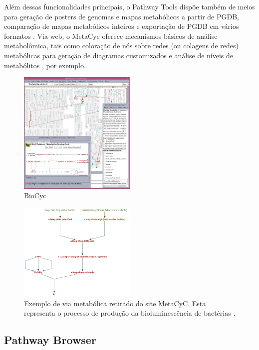 \documentclass[conference]{IEEEtran}
\begin{document}
\indent Além dessas funcionalidades principais, o Pathway Tools dispõe também de meios para geração de posters de genomas e mapas metabólicos a partir de PGDB, comparação de mapas metabólicos inteiros e exportação de PGDB em vários formatos \cite{MetacycDesktopVsWeb}. Via web, o MetaCyc oferece mecanismos básicos de análise metabolômica, tais como coloração de nós sobre redes (ou colagens de redes) metabólicas para geração de diagramas customizados e análise de níveis de metabólitos \cite{MetacycOmicAnalysis}, por exemplo.

\begin{figure}[!t]
\centering
\includegraphics[width=0.5\textwidth]{biocyc-pathwaytool-desktop.png}
\caption{BioCyc}
\label{metacyc_arvore}
\end{figure}


\begin{figure}[!t]
\centering
\includegraphics[width=0.5\textwidth]{bioLuz.png}
\caption{Exemplo de via metabólica retirado do site MetaCyC. Esta representa o processo de produção da bioluminescência de bactérias \cite{examplePathwayMetacyc}.}
\label{metacyc_glycin_small}
\end{figure}

\subsection{Pathway Browser}
\end{document}
